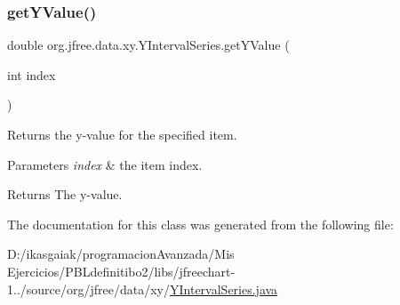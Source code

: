 \subsubsection{\texorpdfstring{get\+Y\+Value()}{getYValue()}}
{\footnotesize\ttfamily double org.\+jfree.\+data.\+xy.\+Y\+Interval\+Series.\+get\+Y\+Value (\begin{DoxyParamCaption}\item[{int}]{index }\end{DoxyParamCaption})}

Returns the y-\/value for the specified item.


\begin{DoxyParams}{Parameters}
{\em index} & the item index.\\
\hline
\end{DoxyParams}
\begin{DoxyReturn}{Returns}
The y-\/value. 
\end{DoxyReturn}


The documentation for this class was generated from the following file\+:\begin{DoxyCompactItemize}
\item 
D\+:/ikasgaiak/programacion\+Avanzada/\+Mis Ejercicios/\+P\+B\+Ldefinitibo2/libs/jfreechart-\/1../source/org/jfree/data/xy/\mbox{\hyperlink{_y_interval_series_8java}{Y\+Interval\+Series.\+java}}\end{DoxyCompactItemize}
